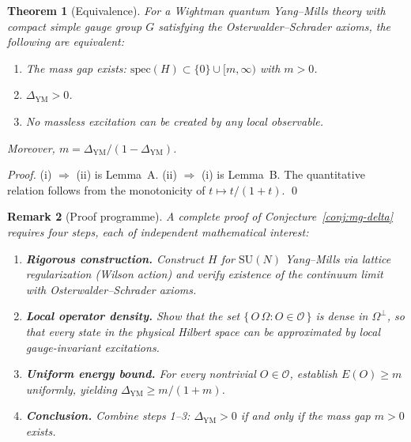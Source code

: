 \documentclass[11pt]{article}
\newtheorem{theorem}{Theorem}[section]
\newtheorem{remark}[theorem]{Remark}
\begin{document}
\begin{theorem}[Equivalence]
\label{thm:ym-equiv}
For a Wightman quantum Yang--Mills theory with compact simple gauge group $G$ satisfying the Osterwalder--Schrader axioms, the following are equivalent:
\begin{enumerate}
  \item[(i)] The mass gap exists: $\mathrm{spec}(H) \subset \{0\} \cup [m, \infty)$ with $m > 0$.
  \item[(ii)] $\Delta_{\mathrm{YM}} > 0$.
  \item[(iii)] No massless excitation can be created by any local observable.
\end{enumerate}
Moreover, $m = \Delta_{\mathrm{YM}} / (1 - \Delta_{\mathrm{YM}})$.
\end{theorem}

\begin{proof}
(i) $\Rightarrow$ (ii) is Lemma~A. (ii) $\Rightarrow$ (i) is Lemma~B. The quantitative relation follows from the monotonicity of $t \mapsto t/(1+t)$. \qed
\end{proof}

\begin{remark}[Proof programme]
\label{rem:proof-programme}
A complete proof of Conjecture~\ref{conj:mg-delta} requires four
steps, each of independent mathematical interest:
\begin{enumerate}
\item \textbf{Rigorous construction.}
      Construct $H$ for $\mathrm{SU}(N)$ Yang--Mills via lattice
      regularization (Wilson action) and verify existence of the
      continuum limit with Osterwalder--Schrader axioms.
\item \textbf{Local operator density.}
      Show that the set
      $\{\,O\,\Omega : O \in \mathcal{O}\,\}$ is dense in
      $\Omega^{\perp}$, so that every state in the physical
      Hilbert space can be approximated by local gauge-invariant
      excitations.
\item \textbf{Uniform energy bound.}
      For every nontrivial $O \in \mathcal{O}$, establish
      $E(O) \geq m$ uniformly, yielding
      $\Delta_{\mathrm{YM}} \geq m/(1+m)$.
\item \textbf{Conclusion.}
      Combine steps 1--3: $\Delta_{\mathrm{YM}} > 0$ if and only
      if the mass gap $m > 0$ exists.
\end{enumerate}
\end{remark}
\end{document}
